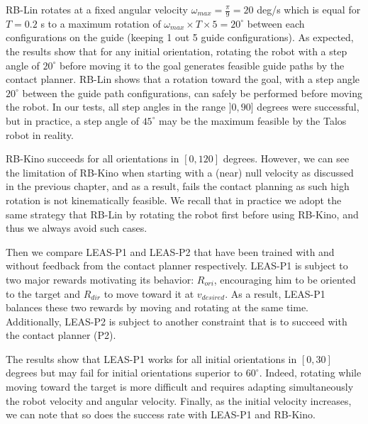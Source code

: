 RB-Lin rotates at a fixed angular velocity $\omega_{max}=\frac{\pi}{9}=20$ deg/s which is equal for $T=0.2$ s to a maximum rotation of $\omega_{max} \times T \times 5 = 20^{\circ}$ between each configurations on the guide (keeping 1 out 5 guide configurations).
As expected, the results show that for any initial orientation, rotating the robot with a step angle of $20^{\circ}$ before moving it to the goal generates feasible guide paths by the contact planner. 
RB-Lin shows that a rotation toward the goal, with a step angle $20^{\circ}$ between the guide path configurations, can safely be performed before moving the robot. 
In our tests, all step angles in the range $]0,90]$ degrees were successful, but in practice, a step angle of $45^{\circ}$ may be the maximum feasible by the Talos robot in reality.

RB-Kino succeeds for all orientations in $[0,120]$ degrees. 
However, we can see the limitation of RB-Kino when starting with a (near) null velocity as discussed in the previous chapter, and as a result, fails the contact planning as such high rotation is not kinematically feasible. 
We recall that in practice we adopt the same strategy that RB-Lin by rotating the robot first before using RB-Kino, and thus we always avoid such cases.

Then we compare LEAS-P1 and LEAS-P2 that have been trained with and without feedback from the contact planner respectively.
LEAS-P1 is subject to two major rewards motivating its behavior: $R_{ori}$, encouraging him to be oriented to the target and $R_{dir}$ to move toward it at $v_{desired}$. 
As a result, LEAS-P1 balances these two rewards by moving and rotating at the same time. 
Additionally, LEAS-P2 is subject to another constraint that is to succeed with the contact planner (P2).

The results show that LEAS-P1 works for all initial orientations in $[0,30]$ degrees but may fail for initial orientations superior to $60^{\circ}$.
Indeed, rotating while moving toward the target is more difficult and requires adapting simultaneously the robot velocity and angular velocity.
Finally, as the initial velocity increases, we can note that so does the success rate with LEAS-P1 and RB-Kino.

